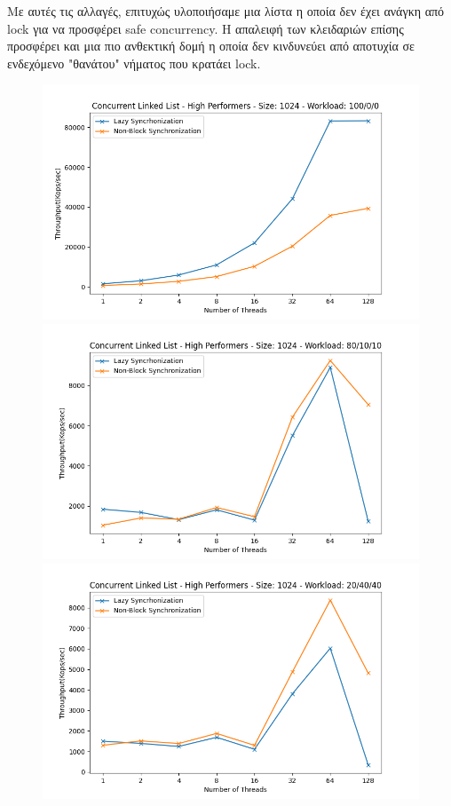\documentclass[../final_report.tex]{subfiles}
\begin{document}
Με αυτές τις αλλαγές, επιτυχώς υλοποιήσαμε μια λίστα η οποία δεν έχει ανάγκη από lock για να προσφέρει safe concurrency. Η απαλειφή των κλειδαριών
επίσης προσφέρει και μια πιο ανθεκτική δομή η οποία δεν κινδυνεύει από αποτυχία σε ενδεχόμενο "θανάτου" νήματος που κρατάει lock.

\begin{figure}[H]
    \centering
        \includegraphics[scale=0.4]{outFiles/plots/concurrent_data_structs_high_1024_100_0_0.png}
        \includegraphics[scale=0.4]{outFiles/plots/concurrent_data_structs_high_1024_80_10_10.png}
        \includegraphics[scale=0.4]{outFiles/plots/concurrent_data_structs_high_1024_20_40_40.png}

\end{figure}
\end{document}
